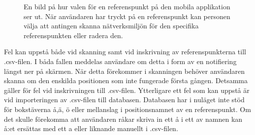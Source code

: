 \documentclass[a4paper,12pt]{article}
\begin{document}
 \begin{figure}[H]
   \centering
   \caption{En bild på hur valen för en referenspunkt på den mobila applikation ser ut. När användaren har tryckt på en referenspunkt kan personen välja att antingen skanna nätverksmiljön för den specifika referenspunkten eller radera den.}
   \label{fig:mob_scan_ref_option}
 \end{figure}

 Fel kan uppstå både vid skanning samt vid inskrivning av referenspunkterna till .csv-filen. I båda fallen meddelas användare om detta i form av en notifiering längst ner på skärmen. När detta förekommer i skanningen behöver användaren skanna om den enskilda positionen som inte fungerade första gången. Detsamma gäller för fel vid inskrivningen till .csv-filen.
 Ytterligare ett fel som kan uppstå är vid importeringen av .csv-filen till databasen. Databasen har i nuläget inte stöd för bokstäverna å,ä, ö eller mellanslag i positionsnamnet av en referenspunkt. Om det skulle förekomma att användaren råkar skriva in ett å i ett av namnen kan å:et ersättas med ett a eller liknande manuellt i .csv-filen.
\end{document}
